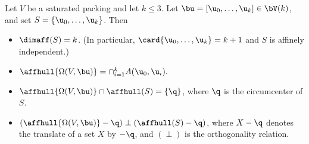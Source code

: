 \begin{lemma}\label{lemma:affhull-center}
Let $V$ be a saturated packing and let $k\le 3$.
Let $\bu=[\u_0,\ldots,\u_k]\in \bV(k)$, and set $S = \{\u_0,\ldots,\u_k\}$.
Then
\begin{itemize}
\item $\dimaff (S)= k$.  (In particular, $\card\{\u_0,\ldots,\u_k\}=k+1$ and
$S$ is affinely independent.)
\item $\affhull{\Omega(V,\bu)}= \cap_{i=1}^k A(\u_0,\u_i).$
\item $\affhull{\Omega(V,\bu)} \cap \affhull(S) = \{\q\}$, 
where $\q$ is the circumcenter of $S$.
\item $(\affhull{\Omega(V,\bu)}-\q) \perp (\affhull(S)-\q)$, where
  $X-\q$ denotes the translate of a set $X$ by $-\q$, and $(\perp)$ is
  the orthogonality relation.
\end{itemize}
\end{lemma}



